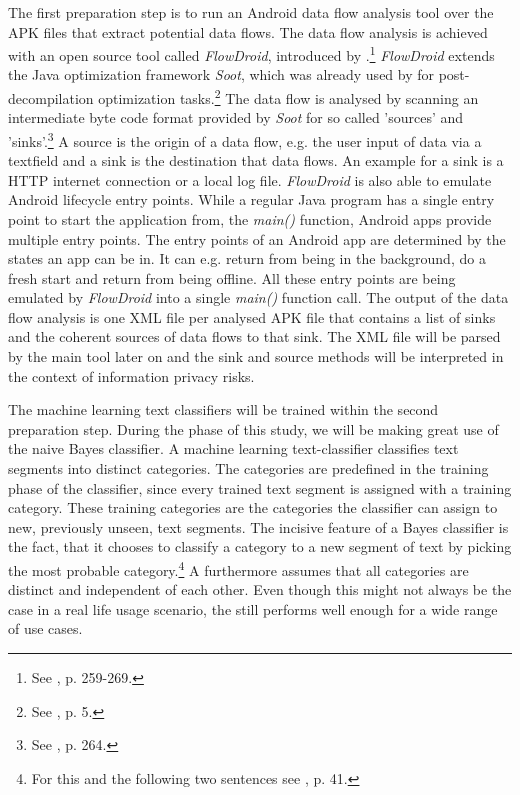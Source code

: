 The first preparation step is to run an Android data flow analysis tool over the APK files that extract potential data flows.
The data flow analysis is achieved with an open source tool called \textit{FlowDroid}, introduced by \cite{Arzt2014}.\footnote{See \cite{Arzt2014}, p. 259-269.}
\textit{FlowDroid} extends the Java optimization framework \textit{Soot}, which was already used by \cite{Enck2011} for post-decompilation optimization tasks.\footnote{See \cite{Enck2011}, p. 5.}
The data flow is analysed by scanning an intermediate byte code format provided by \textit{Soot} for so called 'sources' and 'sinks'.\footnote{See \cite{Arzt2014}, p. 264.}
A source is the origin of a data flow, e.g. the user input of data via a textfield and a sink is the destination that data flows.
An example for a sink is a HTTP internet connection or a local log file.
\textit{FlowDroid} is also able to emulate Android lifecycle entry points.
While a regular Java program has a single entry point to start the application from, the \textit{main()} function, Android apps provide multiple entry points.
The entry points of an Android app are determined by the states an app can be in. 
It can e.g. return from being in the background, do a fresh start and return from being offline.
All these entry points are being emulated by \textit{FlowDroid} into a single \textit{main()} function call.
The output of the data flow analysis is one XML file per analysed APK file that contains a list of sinks and the coherent sources of data flows to that sink.
The XML file will be parsed by the main \sca tool later on and the sink and source methods will be interpreted in the context of information privacy risks.

The machine learning text classifiers will be trained within the second preparation step.
During the \sca phase of this study, we will be making great use of the naive Bayes classifier.
A machine learning text-classifier classifies text segments into distinct categories. 
The categories are predefined in the training phase of the classifier, since every trained text segment is assigned with a training category.
These training categories are the categories the classifier can assign to new, previously unseen, text segments.
The incisive feature of a Bayes classifier is the fact, that it chooses to classify a category to a new segment of text by picking the most probable category.\footnote{For this and the following two sentences see \cite{Rish2001}, p. 41.}
A \nbc furthermore assumes that all categories are distinct and independent of each other. 
Even though this might not always be the case in a real life usage scenario, the \nbc still performs well enough for a wide range of use cases.

